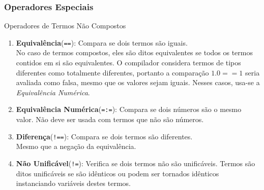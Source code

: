 \begin{frame}[fragile,c]
    \frametitle{Operadores Especiais \textrm{\MakeUppercase{}}}
    
    \begin{block}{Operadores de Termos Não Compostos}

		\begin{enumerate}
    
            \item \textbf{Equivalência}(\verb+==+): Compara se dois termos são iguais.\\No caso de termos
            compostos, eles são ditos equivalentes se todos os termos contidos em si são equivalentes. O 
            compilador considera termos de tipos diferentes como totalmente diferentes, portanto a comparação 
            $1.0 == 1$ seria avaliada como falsa, mesmo que os valores sejam iguais. Nesses casos, usa-se a 
            \emph{Equivalência Numérica}.

            \item \textbf{Equivalência Numérica}(\verb+=:=+): Compara se dois números são o mesmo valor.
            Não deve ser usada com termos que não são números.

            \item \textbf{Diferença}(\verb+!==+): Compara se dois termos são diferentes.\\Mesmo que a negação da 
            equivalência.

            \item \textbf{Não Unificável}(\verb+!=+): Verifica se dois termos não são unificáveis. Termos são 
            ditos unificáveis se são idênticos ou podem ser tornados idênticos instanciando variáveis destes 
            termos.
    	\end{enumerate}
    \end{block}
    
\end{frame}


